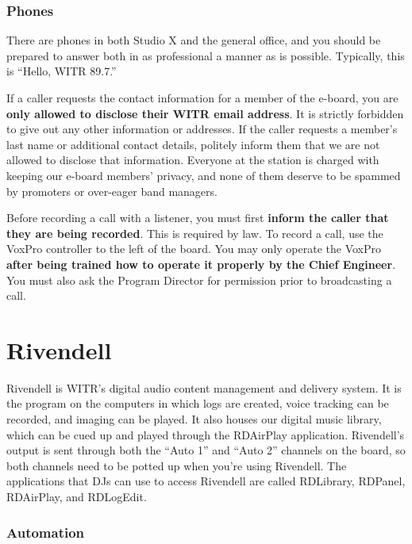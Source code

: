 \documentclass{witrman}
\begin{document}
\subsection{Phones}

There are phones in both Studio X and the general office, and you should be
prepared to answer both in as professional a manner as is possible.  Typically,
this is ``Hello, WITR 89.7.''


If a caller requests the contact information for a member of the e-board, you
are \textbf{only allowed to disclose their WITR email address}.  It is strictly
forbidden to give out any other information or addresses.  If the caller
requests a member's last name or additional contact details, politely inform
them that we are not allowed to disclose that information.  Everyone at the
station is charged with keeping our e-board members' privacy, and none of them
deserve to be spammed by promoters or over-eager band managers.

Before recording a call with a listener, you must first \textbf{inform the
caller that they are being recorded}.  This is required by law.  To record a
call, use the VoxPro controller to the left of the board.  You may only operate
the VoxPro \textbf{after being trained how to operate it properly by the Chief
Engineer}.  You must also ask the Program Director for permission prior to
broadcasting a call.


\chapter{Rivendell}

Rivendell is WITR's digital audio content management and delivery system.  It is
the program on the computers in which logs are created, voice tracking can be
recorded, and imaging can be played.  It also houses our digital music library,
which can be cued up and played through the RDAirPlay application.  Rivendell's
output is sent through both the ``Auto 1'' and ``Auto 2'' channels on the board,
so both channels need to be potted up when you're using Rivendell.  The
applications that DJs can use to access Rivendell are called RDLibrary, RDPanel,
RDAirPlay, and RDLogEdit.

\subsection{Automation}
\end{document}
